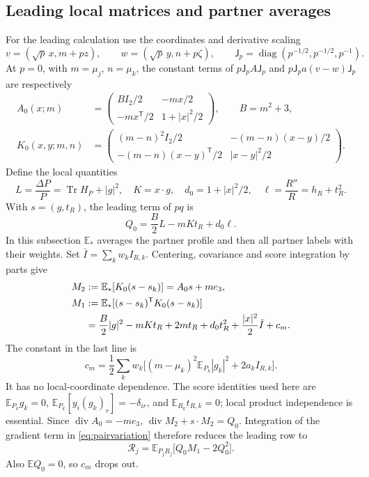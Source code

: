 \documentclass[11pt]{article}
\numberwithin{equation}{section}
\newcommand{\E}{\mathbb E}
\newcommand{\tr}{\operatorname{Tr}}
\newcommand{\diag}{\operatorname{diag}}
\newcommand{\diver}{\operatorname{div}}
\begin{document}
\subsection{Leading local matrices and partner averages}
For the leading calculation use the coordinates and derivative scaling
\[
 v=(\sqrt p\,x,m+pz),\qquad w=(\sqrt p\,y,n+p\zeta),\qquad
 \mathsf J_p=\diag(p^{-1/2},p^{-1/2},p^{-1}).
\]
At \(p=0\), with \(m=\mu_j\), \(n=\mu_k\), the constant terms of
\(p\mathsf J_pA\mathsf J_p\) and
\(p\mathsf J_pa(v-w)\mathsf J_p\) are respectively
\begin{align}
 A_0(x;m)&=
 \begin{pmatrix}
 B I_2/2&-mx/2\\-mx^{\mathsf T}/2&1+|x|^2/2
 \end{pmatrix},\qquad B=m^2+3,\label{eq:A0}\\
 K_0(x,y;m,n)&=
 \begin{pmatrix}
 (m-n)^2I_2/2&-(m-n)(x-y)/2\\
 -(m-n)(x-y)^{\mathsf T}/2&|x-y|^2/2
 \end{pmatrix}.\label{eq:K0}
\end{align}
Define the local quantities
\begin{equation}\label{eq:QLK}
 L=\frac{\Delta P}{P}=\tr H_P+|g|^2,\quad
 K=x\cdot g,\quad d_0=1+|x|^2/2,\quad
 \ell=\frac{R''}{R}=h_R+t_R^2.
\end{equation}
With \(s=(g,t_R)\), the leading term of \(pq\) is
\begin{equation}\label{eq:Q0}
 Q_0=\frac B2 L-mKt_R+d_0\ell.
\end{equation}
In this subsection \(\E_*\) averages the partner profile and then all
partner labels with their weights. Set \(\bar I=\sum_kw_kI_{R,k}\).
Centering, covariance and score integration by parts give
\begin{align}
 M_2&:=\E_*[K_0(s-s_k)]=A_0s+m e_3,\label{eq:M2}\\
 M_1&:=\E_*[(s-s_k)^{\mathsf T}K_0(s-s_k)]\notag\\
 &=\frac B2|g|^2-mKt_R+2mt_R+d_0t_R^2
                  +\frac{|x|^2}{2}\bar I+c_m.\label{eq:M1}
\end{align}
The constant in the last line is
\[
 c_m=\frac12\sum_kw_k\bigl[(m-\mu_k)^2\E_{P_k}|g_k|^2
                                   +2a_kI_{R,k}\bigr].
\]
It has no local-coordinate dependence. The score identities used here
are \(\E_{P_k}g_k=0\),
\(\E_{P_k}[y_i(g_k)_r]=-\delta_{ir}\), and
\(\E_{R_k}t_{R,k}=0\); local product independence is essential.
Since \(\diver A_0=-me_3\),
\(\diver M_2+s\cdot M_2=Q_0\). Integration of the gradient term in
\eqref{eq:pairvariation} therefore reduces the leading row to
\begin{equation}\label{eq:row}
 \mathcal R_j=\E_{P_jR_j}\bigl[Q_0M_1-2Q_0^2\bigr].
\end{equation}
Also \(\E Q_0=0\), so \(c_m\) drops out.
\end{document}
